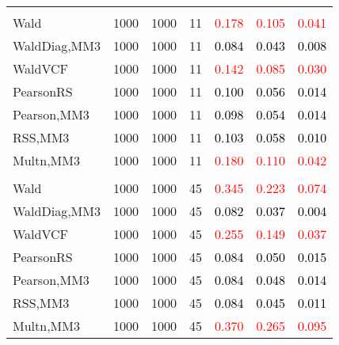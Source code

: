 \documentclass[
]{article}
\begin{document}
\begin{table}[H]
{\begin{tabular}[t]{lrrrrrr}
\addlinespace[0.3em]
\multicolumn{7}{l}{\textbf{2F 10V}}\\
\hspace{1em}Wald & 1000 & 1000 & 11 & \textcolor{red}{0.178} & \textcolor{red}{0.105} & \textcolor{red}{0.041}\\
\hspace{1em}WaldDiag,MM3 & 1000 & 1000 & 11 & \textcolor{black}{0.084} & \textcolor{black}{0.043} & \textcolor{black}{0.008}\\
\hspace{1em}WaldVCF & 1000 & 1000 & 11 & \textcolor{red}{0.142} & \textcolor{red}{0.085} & \textcolor{red}{0.030}\\
\hspace{1em}PearsonRS & 1000 & 1000 & 11 & \textcolor{black}{0.100} & \textcolor{black}{0.056} & \textcolor{black}{0.014}\\
\hspace{1em}Pearson,MM3 & 1000 & 1000 & 11 & \textcolor{black}{0.098} & \textcolor{black}{0.054} & \textcolor{black}{0.014}\\
\hspace{1em}RSS,MM3 & 1000 & 1000 & 11 & \textcolor{black}{0.103} & \textcolor{black}{0.058} & \textcolor{black}{0.010}\\
\hspace{1em}Multn,MM3 & 1000 & 1000 & 11 & \textcolor{red}{0.180} & \textcolor{red}{0.110} & \textcolor{red}{0.042}\\
\addlinespace[0.3em]
\multicolumn{7}{l}{\textbf{3F 15V}}\\
\hspace{1em}Wald & 1000 & 1000 & 45 & \textcolor{red}{0.345} & \textcolor{red}{0.223} & \textcolor{red}{0.074}\\
\hspace{1em}WaldDiag,MM3 & 1000 & 1000 & 45 & \textcolor{black}{0.082} & \textcolor{black}{0.037} & \textcolor{black}{0.004}\\
\hspace{1em}WaldVCF & 1000 & 1000 & 45 & \textcolor{red}{0.255} & \textcolor{red}{0.149} & \textcolor{red}{0.037}\\
\hspace{1em}PearsonRS & 1000 & 1000 & 45 & \textcolor{black}{0.084} & \textcolor{black}{0.050} & \textcolor{black}{0.015}\\
\hspace{1em}Pearson,MM3 & 1000 & 1000 & 45 & \textcolor{black}{0.084} & \textcolor{black}{0.048} & \textcolor{black}{0.014}\\
\hspace{1em}RSS,MM3 & 1000 & 1000 & 45 & \textcolor{black}{0.084} & \textcolor{black}{0.045} & \textcolor{black}{0.011}\\
\hspace{1em}Multn,MM3 & 1000 & 1000 & 45 & \textcolor{red}{0.370} & \textcolor{red}{0.265} & \textcolor{red}{0.095}\\
\bottomrule
\end{tabular}}
\endgroup{}
\end{table}
\end{document}
